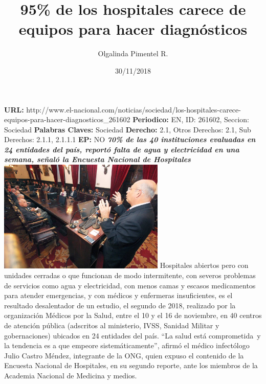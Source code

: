 \documentclass{article}%
\title{\textbf{95\% de los hospitales carece de equipos para hacer diagnósticos}}%
\author{Olgalinda Pimentel R.}%
\date{30/11/2018}%
\begin{document}
%
\normalsize%
\maketitle%
\textbf{URL: }%
http://www.el{-}nacional.com/noticias/sociedad/los{-}hospitales{-}carece{-}equipos{-}para{-}hacer{-}diagnosticos\_261602\newline%
%
\textbf{Periodico: }%
EN, %
ID: %
261602, %
Seccion: %
Sociedad\newline%
%
\textbf{Palabras Claves: }%
Sociedad\newline%
%
\textbf{Derecho: }%
2.1, %
Otros Derechos: %
2.1, %
Sub Derechos: %
2.1.1, 2.1.1.1\newline%
%
\textbf{EP: }%
NO\newline%
\newline%
%
\textbf{\textit{70\% de las 40 instituciones evaluadas en 24 entidades del país, reportó falta de agua y electricidad en una semana, señaló la Encuesta Nacional de Hospitales}}%
\newline%
\newline%
%
\includegraphics[width=300px]{131.jpg}%
\newline%
%
Hospitales abiertos pero con unidades cerradas o que funcionan de modo intermitente, con severos problemas de servicios como agua y electricidad, con menos camas y escasos medicamentos para atender emergencias, y con médicos y enfermeras insuficientes, es el resultado desalentador de un estudio, el segundo de 2018, realizado por la organización Médicos por la Salud, entre el 10 y el 16 de noviembre, en 40 centros de atención pública (adscritos al ministerio, IVSS, Sanidad Militar y gobernaciones) ubicados en 24 entidades del país. “La salud está comprometida~y la tendencia es a que empeore sistemáticamente”, afirmó el médico infectólogo Julio Castro Méndez, integrante de la ONG, quien expuso el contenido de la Encuesta Nacional de Hospitales, en su segundo reporte, ante los miembros de la Academia Nacional de Medicina y medios.%
\newline%
\end{document}
